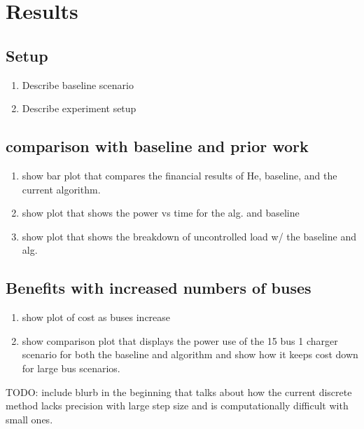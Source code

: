 \section{Results\label{sec:results}}
\subsection{Setup}
\begin{enumerate}
	\item Describe baseline scenario
	\item Describe experiment setup
\end{enumerate}
\subsection{comparison with baseline and prior work} 
\begin{enumerate}
	\item show bar plot that compares the financial results of He, baseline, and the current algorithm.
	\item show plot that shows the power vs time for the alg. and baseline
	\item show plot that shows the breakdown of uncontrolled load w/ the baseline and alg.
\end{enumerate}
\subsection{Benefits with increased numbers of buses}
\begin{enumerate}
	\item show plot of cost as buses increase
	\item show comparison plot that displays the power use of the 15 bus 1 charger scenario for both the baseline and algorithm and show how it keeps cost down for large bus scenarios.
\end{enumerate}
	
TODO: include blurb in the beginning that talks about how the current discrete method lacks precision with large step size and is computationally difficult with small ones.











